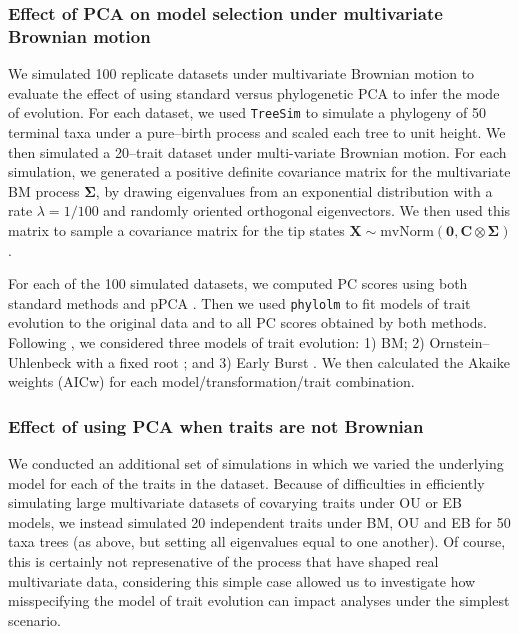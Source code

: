 \documentclass[a4paper,12pt]{article}
\begin{document}
\subsubsection{Effect of PCA on model selection under multivariate Brownian motion}
We simulated 100 replicate datasets under multivariate Brownian motion to evaluate the effect of using standard versus phylogenetic PCA to infer the mode of evolution. For each dataset, we used \texttt{TreeSim} \citep{treesim} to simulate a phylogeny of 50 terminal taxa under a pure--birth process and scaled each tree to unit height. We then simulated a 20--trait dataset under multi-variate Brownian motion. For each simulation, we generated a positive definite covariance matrix for the multivariate BM process $\mathbf{\Sigma}$, by drawing eigenvalues from an exponential distribution with a rate $\lambda = \text{1/100}$ and randomly oriented orthogonal eigenvectors. We then used this matrix to sample a covariance matrix for the tip states $\mathbf{X}\sim \text{mvNorm}(\mathbf{0}, \mathbf{C} \otimes \mathbf{\Sigma})$.

For each of the 100 simulated datasets, we computed PC scores using both standard methods and pPCA \citep[with the \texttt{phytools} package][]{phytools}. Then we used \texttt{phylolm} \citep{HoandAne2014} to fit models of trait evolution to the original data and to all PC scores obtained by both methods. Following \citet{Harmon2010}, we considered three models of trait evolution: 1) BM; 2) Ornstein--Uhlenbeck with a fixed root \citep[OU;][]{ Hansen1997}; and 3) Early Burst \citep[EB;][]{Blomberg2003, Harmon2010}. We then calculated the Akaike weights (AICw) for each model/transformation/trait combination.

\subsubsection{Effect of using PCA when traits are not Brownian}
We conducted an additional set of simulations in which we varied the underlying model for each of the traits in the dataset. Because of difficulties in efficiently simulating large multivariate datasets of covarying traits under OU or EB models, we instead simulated 20 independent traits under BM, OU and EB for 50 taxa trees (as above, but setting all eigenvalues equal to one another). Of course, this is certainly not represenative of the process that have shaped real multivariate data, considering this simple case allowed us to investigate how misspecifying the model of trait evolution can impact analyses under the simplest scenario.
\end{document}
